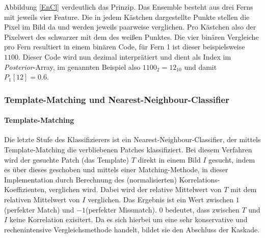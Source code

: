 Abbildung \ref{EnCl} verdeutlich das Prinzip. Das Ensemble besteht aus drei Ferns mit jeweils vier Feature. Die in jedem Kästchen dargestellte Punkte stellen die Pixel im Bild da und werden jeweils paarweise verglichen. Pro Kästchen also der Pixelwert des schwarzer mit dem des weißen Punktes. Die vier binären Vergleiche pro Fern resultiert in einem binären Code, für Fern 1 ist dieser beispielsweise $1100$. Dieser Code wird nun dezimal interprätiert und dient als Index im\textit{ Posterior}-Array, im genannten Beispiel also $1100_{2}=12_{10}$ und damit $P_{1}[12]=0.6$.



\subsubsection{Template-Matching und Nearest-Neighbour-Classifier}

\paragraph{Template-Matching}
Die letzte Stufe des Klassifizierers ist ein Nearest-Neighbour-Classifier, der mittels Template-Matching die verbliebenen Patches klassifiziert. Bei diesem Verfahren wird der gesuchte Patch (das Template) $T$ direkt in einem Bild $I$ gesucht, indem es über dieses geschoben und mittels einer Matching-Methode, in dieser Implementation durch Berechnung des (normalisierten) Korrelations-Koeffizienten, verglichen wird. Dabei wird der relative Mittelwert von $T$ mit dem relativen Mittelwert von $I$ verglichen. Das Ergebnis ist ein Wert zwischen $1$(perfekter Match) und $-1$(perfekter Missmatch). $0$ bedeutet, dass zwischen $T$ und $I$ keine Korrelation exisitert. Da es sich hierbei um eine sehr konservative und rechenintensive Vergleichsmethode handelt, bildet sie den Abschluss der Kaskade.

